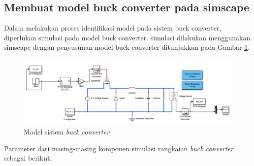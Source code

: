 \documentclass[../main.tex]{subfiles}
\begin{document}
        \subsection{Membuat model buck converter pada simscape}
        Dalam melakukan proses identifikasi model pada sistem buck converter, diperlukan simulasi pada model buck converter. simulasi dilakukan menggunakan simscape dengan penyusunan model buck converter ditunjukkan pada Gambar \ref{model_simulink}.
            \begin{figure}[H]
                \centering
                \includegraphics[width = \textwidth]{assets/image/model_simulink.png}
                \caption{Model sistem \textit{buck converter}}
                \label{model_simulink}
            \end{figure}
        Parameter dari masing-masing komponen simulasi rangkaian \textit{buck converter} sebagai berikut,
\end{document}
